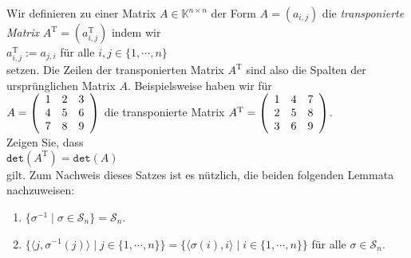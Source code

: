 \exercise
Wir definieren zu einer Matrix $A \in \mathbb{K}^{n \times n}$ der Form $A = (a_{i,j})$ die \emph{transponierte Matrix} 
$A^\mathrm{T} = (a^\mathrm{T}_{i,j})$ indem wir
\\[0.2cm]
\hspace*{1.3cm}
$a^\mathrm{T}_{i,j} := a_{j,i}$ \quad f\"ur alle $i,j \in \{1,\cdots,n\}$
\\[0.2cm]
setzen.  Die Zeilen der transponierten Matrix $A^\mathrm{T}$ sind also die Spalten der urspr\"unglichen Matrix $A$. 
Beispielsweise haben wir f\"ur
\\[0.2cm]
\hspace*{1.3cm}
$A = \left(
  \begin{array}[c]{lll}
    1 & 2 & 3     \\
    4 & 5 & 6     \\
    7 & 8 & 9            
  \end{array}\right)
$
\quad die transponierte Matrix \quad
$A^\mathrm{T} = \left(
  \begin{array}[c]{lll}
    1 & 4 & 7     \\
    2 & 5 & 8     \\
    3 & 6 & 9            
  \end{array}\right)
$.
\\[0.2cm]
Zeigen Sie, dass 
\\[0.2cm]
\hspace*{1.3cm}
$\texttt{det}(A^\mathrm{T}) = \mathtt{det}(A)$
\\[0.2cm]
gilt.  Zum Nachweis dieses Satzes ist es n\"utzlich, die beiden folgenden Lemmata nachzuweisen:
\begin{enumerate}
\item $\{ \sigma^{-1} \mid \sigma \in \mathcal{S}_n \} = \mathcal{S}_n$.
\item $\bigl\{ \langle j, \sigma^{-1}(j)\rangle \mid j \in \{1,\cdots,n\} \bigr\} = \bigl\{ \langle \sigma(i),i\rangle \mid i \in \{1,\cdots,n\} \bigr\}$
       \quad f\"ur alle $\sigma \in \mathcal{S}_n$.
       \eox
\end{enumerate}

